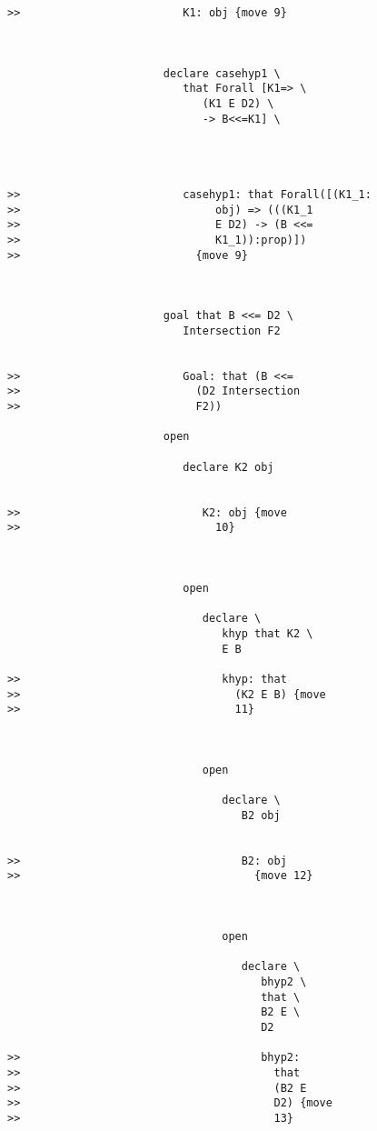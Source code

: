 \documentclass[12pt]{article}
\begin{document}
\begin{verbatim}
>>                         K1: obj {move 9}



                        declare casehyp1 \
                           that Forall [K1=> \
                              (K1 E D2) \
                              -> B<<=K1] \
                           



>>                         casehyp1: that Forall([(K1_1:
>>                              obj) => (((K1_1
>>                              E D2) -> (B <<=
>>                              K1_1)):prop)])
>>                           {move 9}



                        goal that B <<= D2 \
                           Intersection F2


>>                         Goal: that (B <<=
>>                           (D2 Intersection
>>                           F2))

                        open

                           declare K2 obj


>>                            K2: obj {move
>>                              10}



                           open

                              declare \
                                 khyp that K2 \
                                 E B

>>                               khyp: that
>>                                 (K2 E B) {move
>>                                 11}



                              open

                                 declare \
                                    B2 obj


>>                                  B2: obj
>>                                    {move 12}



                                 open

                                    declare \
                                       bhyp2 \
                                       that \
                                       B2 E \
                                       D2

>>                                     bhyp2:
>>                                       that
>>                                       (B2 E
>>                                       D2) {move
>>                                       13}




\end{verbatim}
\end{document}
